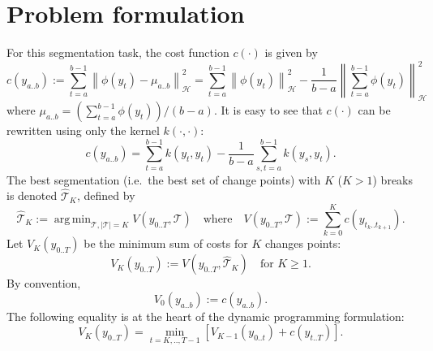 \documentclass[12pt]{article}
\newcommand\HH{\mathcal{H}}
\newcommand{\norm}[1]{\left\lVert#1\right\rVert}
\newcommand{\TT}{\mathcal{T}}
\newcommand{\TThat}{\widehat{\mathcal{T}}}
\DeclareMathOperator*{\argmin}{arg\,min}
\begin{document}
\section{Problem formulation}
For this segmentation task, the cost function $c(\cdot)$ is given by
\begin{equation}
    c(y_{a..b}) := \sum_{t=a}^{b-1} \norm{\phi(y_t) - \mu_{a..b}}_{\HH}^2 = \sum_{t=a}^{b-1} \norm{\phi(y_t)}_{\HH}^2 - \frac{1}{b-a}\norm{\sum_{t=a}^{b-1} \phi(y_t)}^2_\HH
\end{equation}
where $\mu_{a..b} = (\sum_{t=a}^{b-1} \phi(y_t))/(b-a)$.
It is easy to see that $c(\cdot)$ can be rewritten using only the kernel $k(\cdot, \cdot)$:
\begin{equation}
    c(y_{a..b}) = \sum_{t=a}^{b-1} k(y_t, y_t) - \frac{1}{b-a} \sum_{s,t=a}^{b-1} k(y_s,y_t).
\end{equation}
The best segmentation (i.e.\ the best set of change points) with $K$ ($K>1$) breaks is denoted $\TThat_K$, defined by 
\begin{equation}
    \TThat_K := \argmin_{\TT, |\TT|=K} V(y_{0..T}, \TT)\quad\text{where}\quad V(y_{0..T}, \TT):= \sum_{k=0}^{K} c(y_{t_k..t_{k+1}}).
\end{equation}
Let $V_K(y_{0..T})$ be the minimum sum of costs for $K$ changes points:
\begin{equation}
    V_K(y_{0..T}) := V(y_{0..T}, \TThat_K) \quad\text{for } K\geq1.
\end{equation}
By convention,
\begin{equation}
    V_0(y_{a..b}) := c(y_{a..b}).
\end{equation}
The following equality is at the heart of the dynamic programming formulation:
\begin{equation}
    V_K(y_{0..T}) = \min_{t=K,..,T-1} \left[V_{K-1}(y_{0..t}) + c(y_{t..T})\right].
\end{equation}
\end{document}
